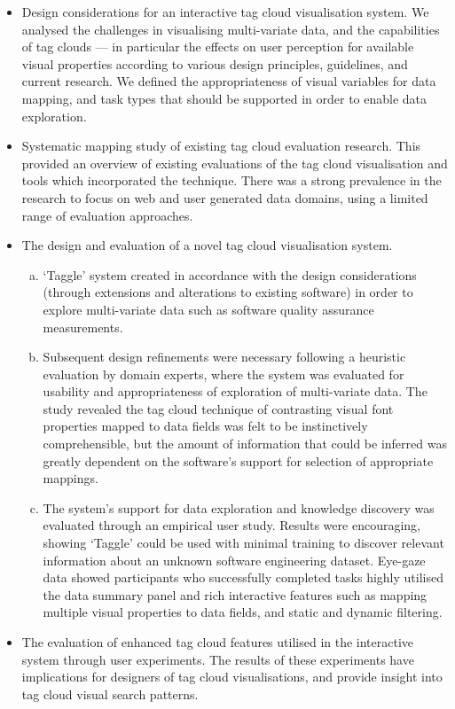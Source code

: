 \begin{itemize}
	\item Design considerations for an interactive tag cloud visualisation system. We analysed the challenges in visualising multi-variate data, and the capabilities of tag clouds --- in particular the effects on user perception for available visual properties according to various design principles, guidelines, and current research. We defined the appropriateness of visual variables for data mapping, and task types that should be supported in order to enable data exploration.
	\item Systematic mapping study of existing tag cloud evaluation research. This provided an overview of existing evaluations of the tag cloud visualisation and tools which incorporated the technique. There was a strong prevalence in the research to focus on web and user generated data domains, using a limited range of evaluation approaches.
	\item The design and evaluation of a novel tag cloud visualisation system.  
	\begin{enumerate}[(a)]
		\item `Taggle' system created in accordance with the design considerations (through extensions and alterations to existing software) in order to explore multi-variate data such as software quality assurance measurements. 
		\item Subsequent design refinements were necessary following a heuristic evaluation by domain experts, where the system was evaluated for usability and appropriateness of exploration of multi-variate data. The study revealed the tag cloud technique of contrasting visual font properties mapped to data fields was felt to be instinctively comprehensible, but the amount of information that could be inferred was greatly dependent on the software's support for selection of appropriate mappings.  
		\item The system's support for data exploration and knowledge discovery was evaluated through an empirical user study. Results were encouraging, showing `Taggle' could be used with minimal training to discover relevant information about an unknown software engineering dataset. Eye-gaze data showed participants who successfully completed tasks highly utilised the data summary panel and rich interactive features such as mapping multiple visual properties to data fields, and static and dynamic filtering.
      \end{enumerate}
	\item The evaluation of enhanced tag cloud features utilised in the interactive system through  user experiments. The results of these experiments have implications for designers of tag cloud visualisations, and provide insight into tag cloud visual search patterns.

\end{itemize}
